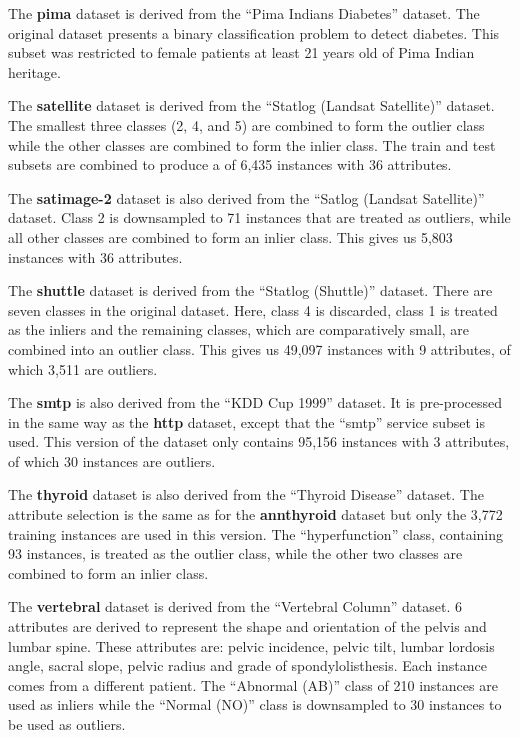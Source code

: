 The \textbf{pima} dataset is derived from the ``Pima Indians Diabetes'' dataset.
The original dataset presents a binary classification problem to detect diabetes.
This subset was restricted to female patients at least 21 years old of Pima Indian heritage.

The \textbf{satellite} dataset is derived from the ``Statlog (Landsat Satellite)'' dataset.
The smallest three classes (2, 4, and 5) are combined to form the outlier class while the other classes are combined to form the inlier class.
The train and test subsets are combined to produce a of 6,435 instances with 36 attributes.

The \textbf{satimage-2} dataset is also derived from the ``Satlog (Landsat Satellite)'' dataset.
Class 2 is downsampled to 71 instances that are treated as outliers, while all other classes are combined to form an inlier class.
This gives us 5,803 instances with 36 attributes.

The \textbf{shuttle} dataset is derived from the ``Statlog (Shuttle)'' dataset.
There are seven classes in the original dataset.
Here, class 4 is discarded, class 1 is treated as the inliers and the remaining classes, which are comparatively small, are combined into an outlier class.
This gives us 49,097 instances with 9 attributes, of which 3,511 are outliers.

The \textbf{smtp} is also derived from the ``KDD Cup 1999'' dataset.
It is pre-processed in the same way as the \textbf{http} dataset, except that the ``smtp'' service subset is used.
This version of the dataset only contains 95,156 instances with 3 attributes, of which 30 instances are outliers.

The \textbf{thyroid} dataset is also derived from the ``Thyroid Disease'' dataset.
The attribute selection is the same as for the \textbf{annthyroid} dataset but only the 3,772 training instances are used in this version.
The ``hyperfunction'' class, containing 93 instances, is treated as the outlier class, while the other two classes are combined to form an inlier class.

The \textbf{vertebral} dataset is derived from the ``Vertebral Column'' dataset.
6 attributes are derived to represent the shape and orientation of the pelvis and lumbar spine.
These attributes are: pelvic incidence, pelvic tilt, lumbar lordosis angle, sacral slope, pelvic radius and grade of spondylolisthesis.
Each instance comes from a different patient.
The ``Abnormal (AB)'' class of 210 instances are used as inliers while the ``Normal (NO)'' class is downsampled to 30 instances to be used as outliers.

